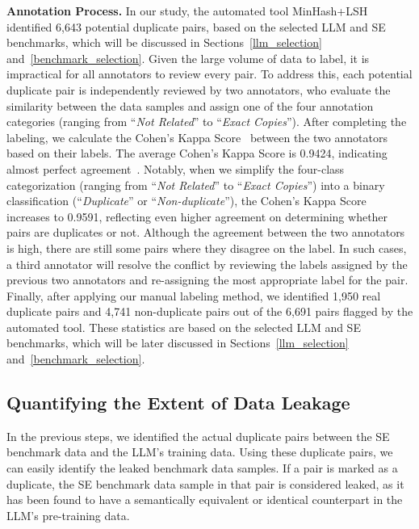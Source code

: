 \vspace{0.1cm}
\noindent \textbf{Annotation Process.} 
In our study, the automated tool MinHash+LSH identified 6,643 potential duplicate pairs, based on the selected LLM and SE benchmarks, which will be discussed in Sections~\ref{llm_selection} and~\ref{benchmark_selection}. Given the large volume of data to label, it is impractical for all annotators to review every pair.
To address this, each potential duplicate pair is independently reviewed by two annotators, who evaluate the similarity between the data samples and assign one of the four annotation categories (ranging from ``\textit{Not Related}'' to ``\textit{Exact Copies}'').
After completing the labeling, we calculate the Cohen's Kappa Score~\cite{Cohens_kappa} between the two annotators based on their labels. The average Cohen's Kappa Score is 0.9424, indicating almost perfect agreement~\cite{landis1977measurement}. Notably, when we simplify the four-class categorization (ranging from ``\textit{Not Related}'' to ``\textit{Exact Copies}'') into a binary classification (``\textit{Duplicate}'' or ``\textit{Non-duplicate}''), the Cohen's Kappa Score increases to 0.9591, reflecting even higher agreement on determining whether pairs are duplicates or not.
Although the agreement between the two annotators is high, there are still some pairs where they disagree on the label. In such cases, a third annotator will resolve the conflict by reviewing the labels assigned by the previous two annotators and re-assigning the most appropriate label for the pair.
Finally, after applying our manual labeling method, we identified 1,950 real duplicate pairs and 4,741 non-duplicate pairs out of the 6,691 pairs flagged by the automated tool. These statistics are based on the selected LLM and SE benchmarks, which will be later discussed in Sections~\ref{llm_selection} and~\ref{benchmark_selection}.


\subsection{Quantifying the Extent of Data Leakage}
In the previous steps, we identified the actual duplicate pairs between the SE benchmark data and the LLM’s training data. Using these duplicate pairs, we can easily identify the leaked benchmark data samples. If a pair is marked as a duplicate, the SE benchmark data sample in that pair is considered leaked, as it has been found to have a semantically equivalent or identical counterpart in the LLM’s pre-training data.

